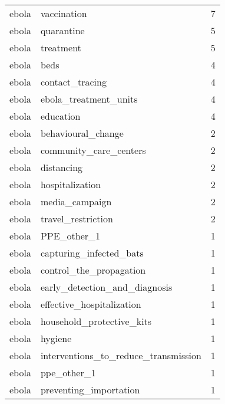 \documentclass[
]{article}
\begin{document}
\begin{longtable}{llr}
ebola & vaccination & 7\\
 
ebola & quarantine & 5\\
 
ebola & treatment & 5\\
 
ebola & beds & 4\\
 
ebola & contact\_tracing & 4\\
 
ebola & ebola\_treatment\_units & 4\\
 
ebola & education & 4\\
 
ebola & behavioural\_change & 2\\
 
ebola & community\_care\_centers & 2\\
 
ebola & distancing & 2\\
 
ebola & hospitalization & 2\\
 
ebola & media\_campaign & 2\\
 
ebola & travel\_restriction & 2\\
 
ebola & PPE\_other\_1 & 1\\
 
ebola & capturing\_infected\_bats & 1\\
 
ebola & control\_the\_propagation & 1\\
 
ebola & early\_detection\_and\_diagnosis & 1\\
 
ebola & effective\_hospitalization & 1\\
 
ebola & household\_protective\_kits & 1\\
 
ebola & hygiene & 1\\
 
ebola & interventions\_to\_reduce\_transmission & 1\\
 
ebola & ppe\_other\_1 & 1\\
 
ebola & preventing\_importation & 1\\
 

\end{longtable}
\end{document}
